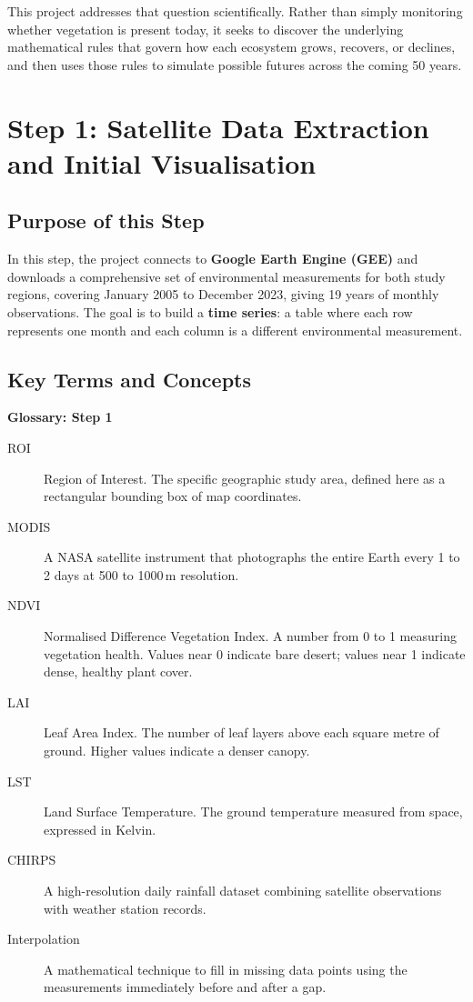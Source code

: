 \documentclass[12pt, a4paper]{article}
\begin{document}
This project addresses that question scientifically. Rather than simply
monitoring whether vegetation is present today, it seeks to discover the
underlying mathematical rules that govern how each ecosystem grows,
recovers, or declines, and then uses those rules to simulate possible futures
across the coming 50 years.

\section{Step 1: Satellite Data Extraction and Initial Visualisation}

\subsection{Purpose of this Step}

In this step, the project connects to \textbf{Google Earth Engine (GEE)}
and downloads a comprehensive set of environmental measurements for both
study regions, covering January 2005 to December 2023, giving 19 years of
monthly observations. The goal is to build a \textbf{time series}: a table
where each row represents one month and each column is a different
environmental measurement.

\subsection{Key Terms and Concepts}

\begin{mdframed}[style=keybox]
\textbf{Glossary: Step 1}\\[6pt]
\begin{description}
    \item[ROI] Region of Interest. The specific geographic study area,
    defined here as a rectangular bounding box of map coordinates.
    \item[MODIS] A NASA satellite instrument that photographs the entire
    Earth every 1 to 2 days at 500 to 1000\,m resolution.
    \item[NDVI] Normalised Difference Vegetation Index. A number from 0
    to 1 measuring vegetation health. Values near 0 indicate bare desert;
    values near 1 indicate dense, healthy plant cover.
    \item[LAI] Leaf Area Index. The number of leaf layers above each square
    metre of ground. Higher values indicate a denser canopy.
    \item[LST] Land Surface Temperature. The ground temperature measured
    from space, expressed in Kelvin.
    \item[CHIRPS] A high-resolution daily rainfall dataset combining
    satellite observations with weather station records.
    \item[Interpolation] A mathematical technique to fill in missing data
    points using the measurements immediately before and after a gap.
\end{description}
\end{mdframed}
\end{document}
